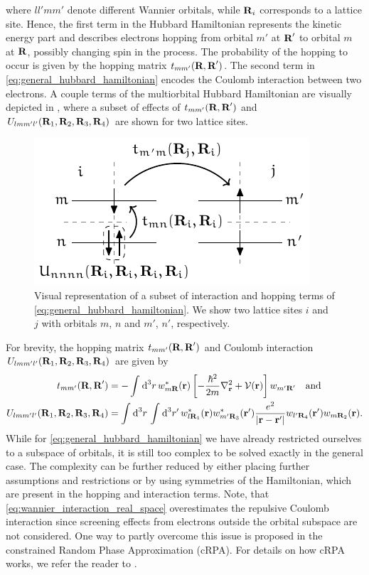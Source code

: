 \documentclass[../../main.tex]{subfiles}
\begin{document}
where $ll'mm'$ denote different Wannier orbitals, while $\textbf{R}_i$ corresponds to a lattice site. Hence, the first term in the Hubbard Hamiltonian represents the kinetic energy part and describes electrons hopping from orbital $m'$ at $\textbf{R}'$ to orbital $m$ at $\textbf{R}$, possibly changing spin in the process. The probability of the hopping to occur is given by the hopping matrix $t_{mm'}(\textbf{R},\textbf{R}')$. The second term in \eqref{eq:general_hubbard_hamiltonian} encodes the Coulomb interaction between two electrons. A couple terms of the multiorbital Hubbard Hamiltonian are visually depicted in , where a subset of effects of $t_{mm'}(\textbf{R},\textbf{R}')$ and $U_{lmm'l'}(\textbf{R}_1,\textbf{R}_2,\textbf{R}_3,\textbf{R}_4)$ are shown for two lattice sites. 
\begin{figure}[ht!]
	\centering
	\includegraphics[width=.45\textwidth]{../../Graphics/Diagrams/two_orbitals_two_sites_hopping/two_orbitals_two_sites_hopping.pdf}
	\caption{Visual representation of a subset of interaction and hopping terms of \eqref{eq:general_hubbard_hamiltonian}. We show two lattice sites $i$ and $j$ with orbitals $m$, $n$ and $m'$, $n'$, respectively.}
	\label{fig:two_orbitals_two_sites_hopping}
\end{figure}
For brevity, the hopping matrix $t_{mm'}(\textbf{R},\textbf{R}')$ and Coulomb interaction $U_{lmm'l'}(\textbf{R}_1,\textbf{R}_2,\textbf{R}_3,\textbf{R}_4)$ are given by
\begin{subequations}
\begin{align}
	t_{mm'}(\textbf{R},\textbf{R}')&=-\int_{}^{}\text{d}^3r\,w^*_{m\textbf{R}}(\textbf{r})\left [-\frac{\hbar^2}{2m}\nabla^2_{\textbf{r}}+\mathcal{V}(\textbf{r})\right ]w_{m'\textbf{R}'}\quad\text{and}\\
	U_{lmm'l'}(\textbf{R}_1,\textbf{R}_2,\textbf{R}_3,\textbf{R}_4)&=\int_{}^{}\text{d}^3r\,\int_{}^{}\text{d}^3r'\,w^*_{l\textbf{R}_1}(\textbf{r})w^*_{m'\textbf{R}_3}(\textbf{r}')\frac{e^2}{|\textbf{r}-\textbf{r}'|}w_{l'\textbf{R}_4}(\textbf{r}')w_{m\textbf{R}_2}(\textbf{r}).\label{eq:wannier_interaction_real_space}
\end{align}
\end{subequations}
While for \eqref{eq:general_hubbard_hamiltonian} we have already restricted ourselves to a subspace of orbitals, it is still too complex to be solved exactly in the general case. The complexity can be further reduced by either placing further assumptions and restrictions or by using symmetries of the Hamiltonian, which are present in the hopping and interaction terms. Note, that \eqref{eq:wannier_interaction_real_space} overestimates the repulsive Coulomb interaction since screening effects from electrons outside the orbital subspace are not considered. One way to partly overcome this issue is proposed in the constrained Random Phase Approximation (cRPA). For details on how cRPA works, we refer the reader to \cite{crpa reference from somewhere}. 
\end{document}
